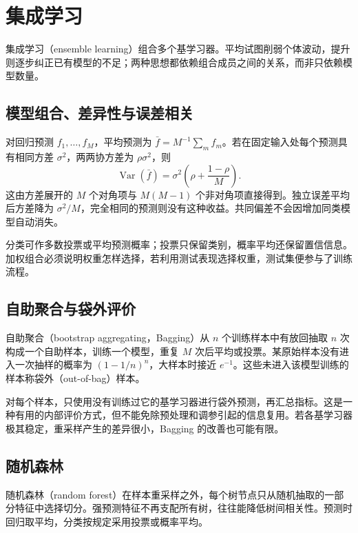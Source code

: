 \setcounter{chapter}{11} %
\chapter{集成学习}
\label{chap:ml-ensembles}

集成学习（ensemble learning）组合多个基学习器。平均试图削弱个体波动，提升则逐步纠正已有模型的不足；两种思想都依赖组合成员之间的关系，而非只依赖模型数量。

\section{模型组合、差异性与误差相关}

对回归预测 $f_1,\ldots,f_M$，平均预测为 $\bar f=M^{-1}\sum_m f_m$。若在固定输入处每个预测具有相同方差 $\sigma^2$，两两协方差为 $\rho\sigma^2$，则
\[
 \operatorname{Var}(\bar f)=\sigma^2\left(\rho+\frac{1-\rho}{M}\right).
\]
这由方差展开的 $M$ 个对角项与 $M(M-1)$ 个非对角项直接得到。独立误差平均后方差降为 $\sigma^2/M$，完全相同的预测则没有这种收益。共同偏差不会因增加同类模型自动消失。

分类可作多数投票或平均预测概率；投票只保留类别，概率平均还保留置信信息。加权组合必须说明权重怎样选择，若利用测试表现选择权重，测试集便参与了训练流程。

\section{自助聚合与袋外评价}

自助聚合（bootstrap aggregating，Bagging）从 $n$ 个训练样本中有放回抽取 $n$ 次构成一个自助样本，训练一个模型，重复 $M$ 次后平均或投票。某原始样本没有进入一次抽样的概率为 $(1-1/n)^n$，大样本时接近 $e^{-1}$。这些未进入该模型训练的样本称袋外（out-of-bag）样本。

对每个样本，只使用没有训练过它的基学习器进行袋外预测，再汇总指标。这是一种有用的内部评价方式，但不能免除预处理和调参引起的信息复用。若各基学习器极其稳定，重采样产生的差异很小，Bagging 的改善也可能有限。

\section{随机森林}

随机森林（random forest）在样本重采样之外，每个树节点只从随机抽取的一部分特征中选择切分。强预测特征不再支配所有树，往往能降低树间相关性。预测时回归取平均，分类按规定采用投票或概率平均。

